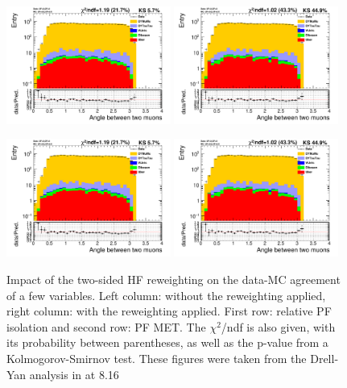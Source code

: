 \begin{figure}
 \begin{center}  
  \includegraphics[width=0.48\textwidth,page=68]{Figures/WBoson/Analysis/EventSelection/dataMC_Powheg_MomUnCor_norew}\hfill
  \includegraphics[width=0.48\textwidth,page=68]{Figures/WBoson/Analysis/EventSelection/dataMC_Powheg_MomUnCor_rewboth}
  
  \includegraphics[width=0.48\textwidth,page=57]{Figures/WBoson/Analysis/EventSelection/dataMC_Powheg_MomUnCor_norew}\hfill
  \includegraphics[width=0.48\textwidth,page=57]{Figures/WBoson/Analysis/EventSelection/dataMC_Powheg_MomUnCor_rewboth}
 \end{center}
\caption{Impact of the two-sided HF reweighting on the data-MC agreement of a few variables. Left column: without the reweighting applied, right column: with the reweighting applied.
First row: relative PF isolation and second row: PF MET. The $\chi^2$/ndf is also given, with its probability between parentheses,
as well as the p-value from a Kolmogorov-Smirnov test. These figures were taken from the Drell-Yan analysis in \pPb at 8.16~\TeV \cite{DY_pPb}}
\label{fig:hfrew_2}
\end{figure}

\clearpage

